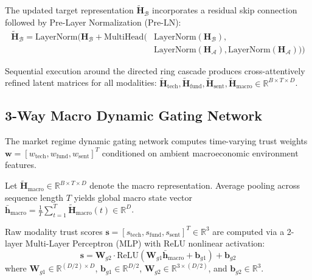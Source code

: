 The updated target representation $\tilde{\mathbf{H}}_{\mathcal{B}}$ incorporates a residual skip connection followed by Pre-Layer Normalization ($\text{Pre-LN}$):
\begin{equation}
\begin{aligned}
\tilde{\mathbf{H}}_{\mathcal{B}} = \text{LayerNorm}\Big( \mathbf{H}_{\mathcal{B}} + \text{MultiHead}\big( &\text{LayerNorm}(\mathbf{H}_{\mathcal{B}}), \\
&\text{LayerNorm}(\mathbf{H}_{\mathcal{A}}), \text{LayerNorm}(\mathbf{H}_{\mathcal{A}}) \big) \Big)
\end{aligned}
\label{eq:ch4_ring_residual_ln}
\end{equation}

Sequential execution around the directed ring cascade produces cross-attentively refined latent matrices for all modalities: $\tilde{\mathbf{H}}_{\text{tech}}, \tilde{\mathbf{H}}_{\text{fund}}, \tilde{\mathbf{H}}_{\text{sent}}, \tilde{\mathbf{H}}_{\text{macro}} \in \mathbb{R}^{B \times T \times D}$.

\subsection{3-Way Macro Dynamic Gating Network}
\label{subsec:ch4_dynamic_gating}

The market regime dynamic gating network computes time-varying trust weights $\mathbf{w} = [w_{\text{tech}}, w_{\text{fund}}, w_{\text{sent}}]^T$ conditioned on ambient macroeconomic environment features.

Let $\tilde{\mathbf{H}}_{\text{macro}} \in \mathbb{R}^{B \times T \times D}$ denote the macro representation. Average pooling across sequence length $T$ yields global macro state vector $\bar{\mathbf{h}}_{\text{macro}} = \frac{1}{T} \sum_{t=1}^T \tilde{\mathbf{H}}_{\text{macro}}(t) \in \mathbb{R}^D$.

Raw modality trust scores $\mathbf{s} = [s_{\text{tech}}, s_{\text{fund}}, s_{\text{sent}}]^T \in \mathbb{R}^3$ are computed via a 2-layer Multi-Layer Perceptron (MLP) with ReLU nonlinear activation:
\begin{equation}
\mathbf{s} = \mathbf{W}_{g2} \cdot \text{ReLU}\left( \mathbf{W}_{g1} \bar{\mathbf{h}}_{\text{macro}} + \mathbf{b}_{g1} \right) + \mathbf{b}_{g2}
\label{eq:ch4_gating_mlp}
\end{equation}
where $\mathbf{W}_{g1} \in \mathbb{R}^{(D/2) \times D}$, $\mathbf{b}_{g1} \in \mathbb{R}^{D/2}$, $\mathbf{W}_{g2} \in \mathbb{R}^{3 \times (D/2)}$, and $\mathbf{b}_{g2} \in \mathbb{R}^3$.


